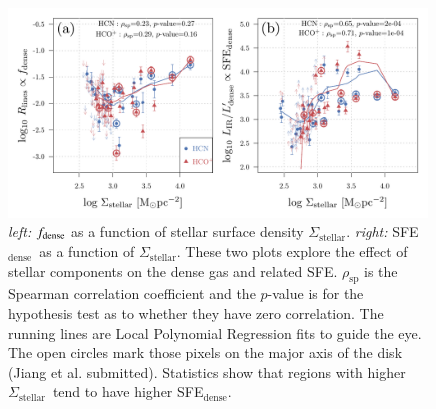 \documentclass[legal,11pt]{article}
\newcommand{\sigmastellar}{$\Sigma_\text{stellar}$}
\newcommand{\sfedense}{SFE$_\text{dense}$}
\begin{document}
\begin{figure}
\centering
\includegraphics[width=0.99\textwidth]{Jiang_SFE_star.pdf}
\caption{
{\it left:} $f_{\rm dense}$ as a function of stellar surface density \sigmastellar. {\it right:} \sfedense\ as a function of \sigmastellar. These 
two plots explore the effect of stellar components on the dense gas and related
SFE. 
$\rho_\text{sp}$ is the Spearman correlation coefficient and the $p$-value is for the hypothesis test as to whether they have zero correlation. 
The running lines are Local Polynomial Regression fits to guide the eye. The open circles mark those pixels on the major axis of the disk (Jiang et al. submitted). Statistics show that regions with higher \sigmastellar\ tend to have
higher \sfedense.
%
} \label{fig:obs}

\end{figure}

%
%
%
\end{document}
